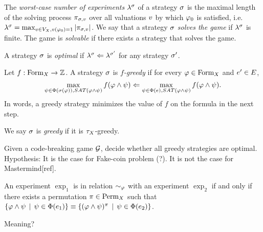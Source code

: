 The \emph{worst-case number of experiments} $\lambda^{\sigma}$
  of a strategy $\sigma$ is the maximal length of the solving process
  $\pi_{\sigma,v}$ over all valuations $v$ by which $\varphi_0$ is satisfied,
  i.e.
  $\lambda^{\sigma} = \max_{v\in V_X, v(\varphi_0) = 1} |\pi_{\sigma,v}|$.
We say that a strategy $\sigma$ \emph{solves the game} if $\lambda^{\sigma}$ is finite.
The game is \emph{solvable} if there exists a strategy that solves the game.


\begin{definition}
A strategy $\sigma$ is \emph{optimal} if
  $\lambda^{\sigma} <= \lambda^{\sigma'}$ for any strategy $\sigma'$.
\end{definition}

\begin{definition}
Let $f: \textrm{Form}_X -> \mathbb{Z}$.
A strategy $\sigma$ is \emph{$f$-greedy} if
  for every $\varphi\in\textrm{Form}_X$ and $e'\in E$,
\[
\max_{\psi \in \Phi(\sigma(\varphi)), SAT(\varphi\wedge\psi)} f(\varphi\wedge\psi) <=
\max_{\psi \in \Phi(e), SAT(\varphi\wedge\psi)} f(\varphi\wedge\psi).
\]
In words, a greedy strategy minimizes
  the value of $f$ on the formula in the next step.

We say $\sigma$ is \emph{greedy} if it is $\tau_X$-greedy.
\end{definition}


\begin{problem}
Given a code-breaking game $\mathcal{G}$,
  decide whether all greedy strategies are optimal.
Hypothesis: It is the case for Fake-coin problem (?).
  It is not the case for Mastermind[ref].
\end{problem}


\begin{definition}
An experiment $\exp_1$ is in relation $\sim_\varphi$ with an experiment $\exp_2$ if
 and only if there exists a permutation $\pi\in\textrm{Perm}_X$ such that
 $ \{ \varphi\wedge\psi \:\:|\:\: \psi\in\Phi(e_1) \} \equiv
   \{ (\varphi\wedge\psi)^\pi \:\:|\:\: \psi\in\Phi(e_2) \} $.
\end{definition}

Meaning?
